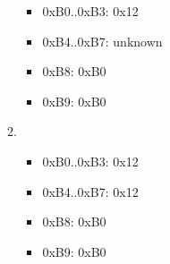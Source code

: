 \documentclass{article}
\begin{document}
\begin{enumerate}[label=\textbf{\arabic*})]
\begin{enumerate}[label=\textbf{\alph*}.]
            \begin{itemize}
                \item 0xB0..0xB3: 0x12
                \item 0xB4..0xB7: unknown
                \item 0xB8: 0xB0
                \item 0xB9: 0xB0
            \end{itemize}
            \item
            \begin{itemize}
                \item 0xB0..0xB3: 0x12
                \item 0xB4..0xB7: 0x12
                \item 0xB8: 0xB0
                \item 0xB9: 0xB0
            \end{itemize}
        \end{enumerate}
    
\end{enumerate}
\end{document}
